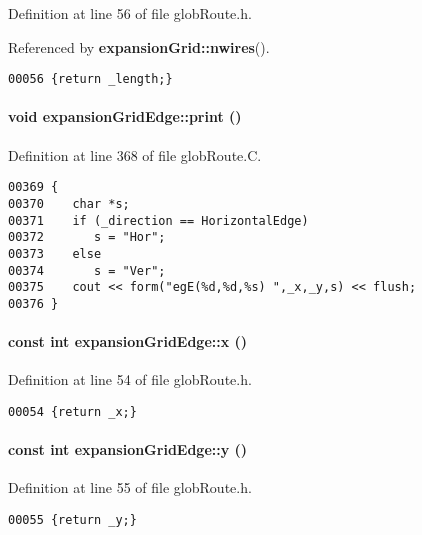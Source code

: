 Definition at line 56 of file glob\-Route.h.

Referenced by {\bf expansion\-Grid::nwires}().\small\begin{verbatim}00056 {return _length;}
\end{verbatim}\normalsize 
\label{expansionGridEdge_a8}
\paragraph{\setlength{\rightskip}{0pt plus 5cm}void expansion\-Grid\-Edge::print ()\hspace{0.3cm}{\tt  [virtual]}}\hfill



Definition at line 368 of file glob\-Route.C.\small\begin{verbatim}00369 {
00370    char *s;
00371    if (_direction == HorizontalEdge)
00372       s = "Hor";
00373    else
00374       s = "Ver";
00375    cout << form("egE(%d,%d,%s) ",_x,_y,s) << flush;
00376 }
\end{verbatim}\normalsize 
\label{expansionGridEdge_a4}
\paragraph{\setlength{\rightskip}{0pt plus 5cm}const int expansion\-Grid\-Edge::x ()\hspace{0.3cm}{\tt  [inline]}}\hfill



Definition at line 54 of file glob\-Route.h.\small\begin{verbatim}00054 {return _x;}
\end{verbatim}\normalsize 
\label{expansionGridEdge_a5}
\paragraph{\setlength{\rightskip}{0pt plus 5cm}const int expansion\-Grid\-Edge::y ()\hspace{0.3cm}{\tt  [inline]}}\hfill



Definition at line 55 of file glob\-Route.h.\small\begin{verbatim}00055 {return _y;}
\end{verbatim}\normalsize 


